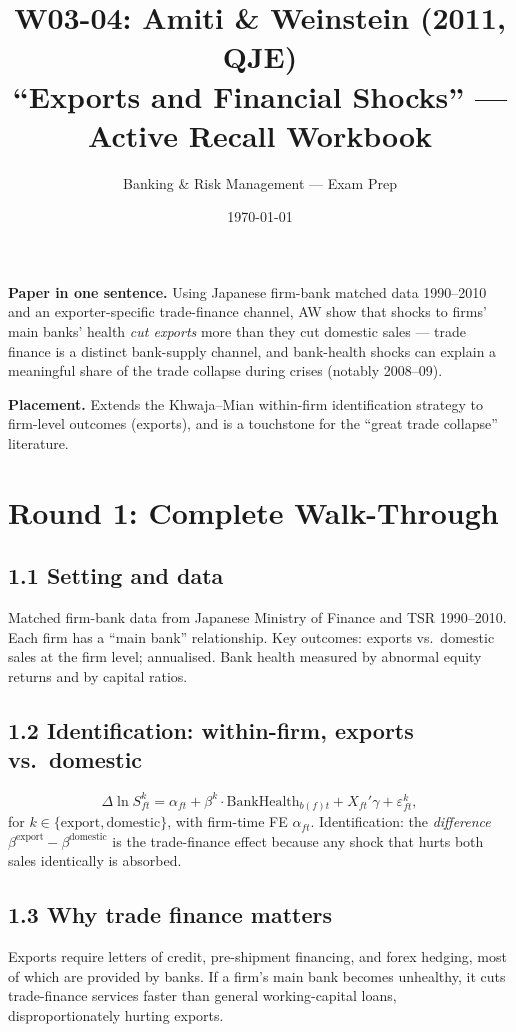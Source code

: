 \documentclass[11pt]{article}
\title{W03-04: Amiti \& Weinstein (2011, QJE) \\
\large ``Exports and Financial Shocks'' --- Active Recall Workbook}
\author{Banking \& Risk Management --- Exam Prep}
\date{\today}
\begin{document}
\maketitle

\begin{keybox}
\textbf{Paper in one sentence.} Using Japanese firm-bank matched data 1990--2010 and an exporter-specific trade-finance channel, AW show that shocks to firms' main banks' health \emph{cut exports} more than they cut domestic sales --- trade finance is a distinct bank-supply channel, and bank-health shocks can explain a meaningful share of the trade collapse during crises (notably 2008--09).

\textbf{Placement.} Extends the Khwaja--Mian within-firm identification strategy to firm-level outcomes (exports), and is a touchstone for the ``great trade collapse'' literature.
\end{keybox}

\section*{Round 1: Complete Walk-Through}

\subsection*{1.1 Setting and data}
Matched firm-bank data from Japanese Ministry of Finance and TSR 1990--2010. Each firm has a ``main bank'' relationship. Key outcomes: exports vs.\ domestic sales at the firm level; annualised. Bank health measured by abnormal equity returns and by capital ratios.

\subsection*{1.2 Identification: within-firm, exports vs.\ domestic}
\[
\Delta \ln S^k_{ft}=\alpha_{ft}+\beta^k\cdot\text{BankHealth}_{b(f)t}+X_{ft}'\gamma+\varepsilon_{ft}^k,
\]
for $k\in\{\text{export},\text{domestic}\}$, with firm-time FE $\alpha_{ft}$. Identification: the \emph{difference} $\beta^{\text{export}}-\beta^{\text{domestic}}$ is the trade-finance effect because any shock that hurts both sales identically is absorbed.

\subsection*{1.3 Why trade finance matters}
Exports require letters of credit, pre-shipment financing, and forex hedging, most of which are provided by banks. If a firm's main bank becomes unhealthy, it cuts trade-finance services faster than general working-capital loans, disproportionately hurting exports.
\end{document}
